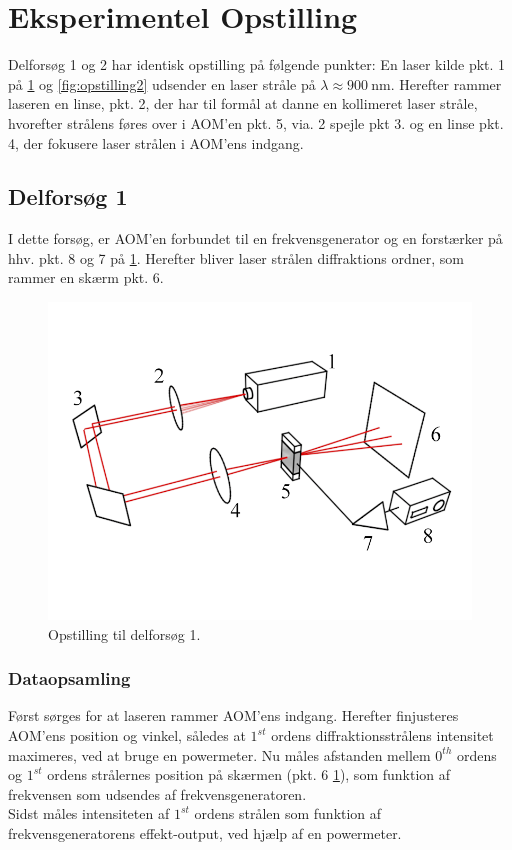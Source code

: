 \documentclass[main]{subfiles}
\begin{document}
\section{Eksperimentel Opstilling}
Delforsøg 1 og 2 har identisk opstilling på følgende punkter: En laser kilde pkt. 1 på \cref{fig:opstilling1} og \cref{fig:opstilling2} udsender en laser stråle på $\lambda \approx  \SI{900}{\nano\m} $. Herefter rammer laseren en linse, pkt. 2, der har til formål at danne en kollimeret laser stråle, hvorefter strålens føres over i AOM'en pkt. 5, via. 2 spejle pkt 3. og en linse pkt. 4, der fokusere laser strålen i AOM'ens indgang.

\subsection{Delforsøg 1}
I dette forsøg, er AOM'en forbundet til en frekvensgenerator og en forstærker på hhv. pkt. 8 og 7 på \cref{fig:opstilling1}. Herefter bliver laser strålen diffraktions ordner, som rammer en skærm pkt. 6.
\begin{figure}[H]
    \includegraphics[width=\linewidth]{tegninger/tegning1.png}
    \caption{Opstilling til delforsøg 1.}
    \label{fig:opstilling1}
\end{figure}

\subsubsection{Dataopsamling}\label{dataopsamling1}
Først sørges for at laseren rammer AOM'ens indgang. Herefter finjusteres AOM'ens position og vinkel, således at $1^{st}$ ordens diffraktionsstrålens intensitet maximeres, ved at bruge en powermeter. Nu måles afstanden mellem $0^{th}$ ordens og $1^{st}$ ordens strålernes position på skærmen (pkt. 6 \cref{fig:opstilling1}), som funktion af frekvensen som udsendes af frekvensgeneratoren.
\\ Sidst måles intensiteten af $1^{st}$ ordens strålen som funktion af frekvensgeneratorens effekt-output, ved hjælp af en powermeter.
\end{document}
